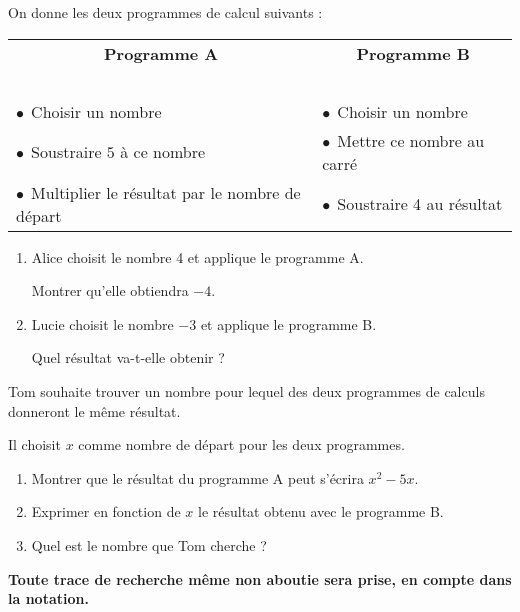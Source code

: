 
\medskip

On donne les deux programmes de calcul suivants :

\begin{center}
\begin{tabularx}{\linewidth}{|X|X|}\hline 
\multicolumn{1}{|c|}{\textbf{Programme A}}&\multicolumn{1}{|c|}{\textbf{Programme B}}\\
~&~\\
$\bullet~~$Choisir un nombre								&$\bullet~~$Choisir un nombre\\
$\bullet~~$Soustraire $5$ à ce nombre						&$\bullet~~$Mettre ce nombre au carré\\
$\bullet~~$Multiplier le résultat par le nombre de départ	&$\bullet~~$Soustraire 4 au résultat\\ \hline
\end{tabularx}
\end{center}

\medskip

\begin{enumerate}
\item Alice choisit le nombre 4 et applique le programme A. 

Montrer qu'elle obtiendra $- 4$.
\item Lucie choisit le nombre $- 3$ et applique le programme B. 

Quel résultat va-t-elle obtenir ?
\end{enumerate}

Tom souhaite trouver un nombre pour lequel des deux programmes de calculs donneront le même résultat.

Il choisit $x$ comme nombre de départ pour les deux programmes.
\begin{enumerate}[resume]
\item Montrer que le résultat du programme A peut s'écrira $x^2 - 5x$.
\item Exprimer en fonction de $x$ le résultat obtenu avec le programme B.
\item Quel est le nombre que Tom cherche ?
\end{enumerate}

\textbf{Toute trace de recherche même non aboutie sera prise, en compte dans la notation.}

\vspace{0,5cm}

